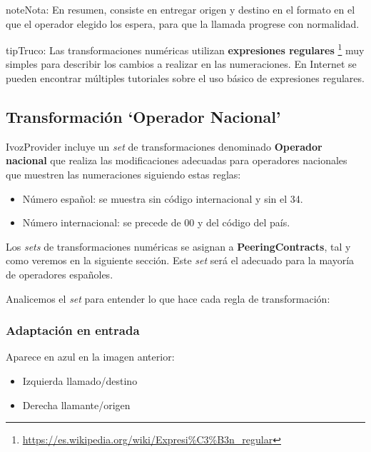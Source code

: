\documentclass[letterpaper,10pt,spanish]{sphinxmanual}
\begin{document}
\begin{notice}{note}{Nota:}
En resumen, consiste en entregar origen y destino en el formato en el que el operador elegido los espera, para que la llamada progrese con normalidad.
\end{notice}

\begin{notice}{tip}{Truco:}
Las transformaciones numéricas utilizan \textbf{expresiones regulares} \footnote[*]{\sphinxAtStartFootnote%
\url{https://es.wikipedia.org/wiki/Expresi\%C3\%B3n\_regular}
} muy simples para describir los cambios a realizar en las numeraciones. En Internet se pueden encontrar múltiples tutoriales sobre el uso básico de expresiones regulares.
\end{notice}


\subsection{Transformación `Operador Nacional'}
\label{external_incoming_calls/numeric_transformations:transformacion-operador-nacional}
IvozProvider incluye un \emph{set} de transformaciones denominado \textbf{Operador nacional} que realiza las modificaciones adecuadas para operadores nacionales que muestren las numeraciones siguiendo estas reglas:
\begin{itemize}
\item {} 
Número español: se muestra sin código internacional y sin el 34.

\item {} 
Número internacional: se precede de 00 y del código del país.

\end{itemize}

Los \emph{sets} de transformaciones numéricas se asignan a \textbf{PeeringContracts}, tal y como veremos en la siguiente sección. Este \emph{set} será el adecuado para la mayoría de operadores españoles.

Analicemos el \emph{set} para entender lo que hace cada regla de transformación:

\noindent{}


\subsubsection{Adaptación en entrada}
\label{external_incoming_calls/numeric_transformations:id2}
Aparece en azul en la imagen anterior:
\begin{itemize}
\item {} 
Izquierda llamado/destino

\item {} 
Derecha llamante/origen

\end{itemize}
\end{document}
